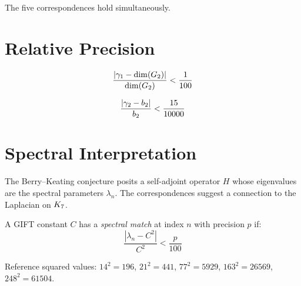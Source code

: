 \begin{theorem}\label{thm:all_correspondences}
    \leanok
    The five correspondences hold simultaneously.
\end{theorem}

\section{Relative Precision}

\begin{theorem}\label{thm:gamma1_rel}
    \leanok
    \[
        \frac{|\gamma_1 - \mathrm{dim}(G_2)|}{\mathrm{dim}(G_2)} < \frac{1}{100}
    \]
\end{theorem}

\begin{theorem}\label{thm:gamma2_rel}
    \leanok
    \[
        \frac{|\gamma_2 - b_2|}{b_2} < \frac{15}{10000}
    \]
\end{theorem}

\section{Spectral Interpretation}

The Berry--Keating conjecture posits a self-adjoint operator $H$ whose
eigenvalues are the spectral parameters $\lambda_n$. The correspondences
suggest a connection to the Laplacian on $K_7$.

\begin{definition}\label{def:spectral_match}
    \leanok
    A GIFT constant $C$ has a \emph{spectral match} at index $n$ with
    precision $p$ if:
    \[
        \frac{|\lambda_n - C^2|}{C^2} < \frac{p}{100}
    \]
\end{definition}

\begin{theorem}\label{thm:squared_constants}
    \leanok
    Reference squared values:
    $14^2 = 196$, $21^2 = 441$, $77^2 = 5929$, $163^2 = 26569$, $248^2 = 61504$.
\end{theorem}

